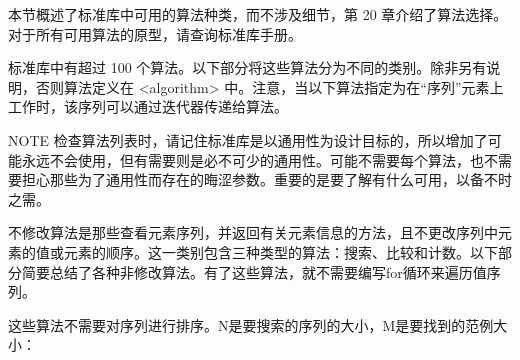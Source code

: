 本节概述了标准库中可用的算法种类，而不涉及细节，第 20 章介绍了算法选择。对于所有可用算法的原型，请查询标准库手册。

标准库中有超过 100 个算法。以下部分将这些算法分为不同的类别。除非另有说明，否则算法定义在 <algorithm> 中。注意，当以下算法指定为在“序列”元素上工作时，该序列可以通过迭代器传递给算法。

\begin{myNotic}{NOTE}
检查算法列表时，请记住标准库是以通用性为设计目标的，所以增加了可能永远不会使用，但有需要则是必不可少的通用性。可能不需要每个算法，也不需要担心那些为了通用性而存在的晦涩参数。重要的是要了解有什么可用，以备不时之需。
\end{myNotic}


不修改算法是那些查看元素序列，并返回有关元素信息的方法，且不更改序列中元素的值或元素的顺序。这一类别包含三种类型的算法：搜索、比较和计数。以下部分简要总结了各种非修改算法。有了这些算法，就不需要编写for循环来遍历值序列。


这些算法不需要对序列进行排序。N是要搜索的序列的大小，M是要找到的范例大小：

